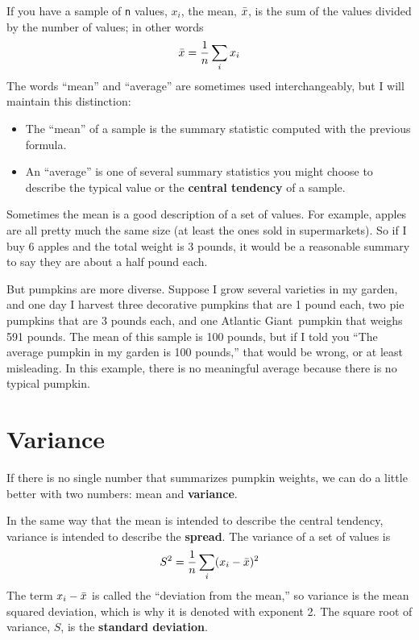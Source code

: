 \documentclass[12pt]{book}
\begin{document}
If you have a sample of {\tt n} values, $x_i$, the mean, $\bar{x}$, is
the sum of the values divided by the number of values; in other words
%
\[ \bar{x} = \frac{1}{n} \sum_i x_i \]
%
The words ``mean'' and ``average'' are sometimes used interchangeably,
but I will maintain this distinction:

\begin{itemize}

\item The ``mean'' of a sample is the summary statistic computed with
  the previous formula.

\item An ``average'' is one of several summary statistics you might
  choose to describe the typical value or the
  {\bf central tendency} of a sample.

\end{itemize}

Sometimes the mean is a good description of a set of values.  For
example, apples are all pretty much the same size (at least the ones
sold in supermarkets).  So if I buy 6 apples and the total weight is 3
pounds, it would be a reasonable summary to say they are about a half
pound each.

But pumpkins are more diverse.  Suppose I grow several varieties in my
garden, and one day I harvest three decorative pumpkins that are 1
pound each, two pie pumpkins that are 3 pounds each, and one Atlantic
Giant\textregistered~pumpkin that weighs 591 pounds.  The mean of
this sample is 100 pounds, but if I told you ``The average pumpkin
in my garden is 100 pounds,'' that would be wrong, or at least
misleading.  In this example, there is no meaningful average because
there is no typical pumpkin.



\section{Variance}

If there is no single number that summarizes pumpkin weights,
we can do a little better with two numbers: mean and {\bf variance}.

In the same way that the mean is intended to describe the central
tendency, variance is intended to describe the {\bf spread}.
The variance of a set of values is
%
\[ S^2 = \frac{1}{n} \sum_i (x_i - \bar{x})^2 \]
%
The term $x_i - \bar{x}$ is called the ``deviation from the mean,'' so
variance is the mean squared deviation, which is why it is denoted
with exponent 2.  The square root of variance, $S$, is the
{\bf standard deviation}.   
\end{document}
